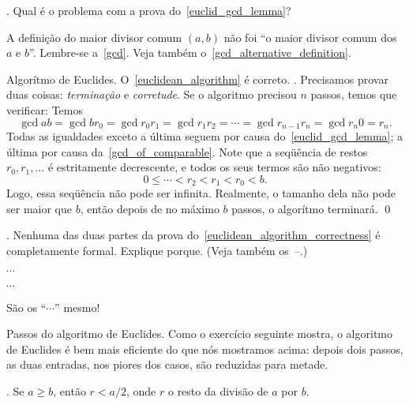 \exercise.
\label{what_is_the_problem_with_euclid_gcd_lemma}%
Qual é o problema com a prova do~\ref{euclid_gcd_lemma}?

\solution
A definição do maior divisor comum $(a,b)$ não foi
``o maior divisor comum dos $a$ e $b$''.
Lembre-se a~\ref{gcd}.
Veja também o~\ref{gcd_alternative_definition}.

\endexercise

\theorem Algorítmo de Euclides.
\label{euclidean_algorithm_correctness}%
O~\ref{euclidean_algorithm} é correto.
\proof.
Precisamos provar duas coisas: \emph{terminação\/}\/ e \emph{corretude}.
\endgraf
{}
Se o algoritmo precisou $n$ passos, temos que verificar:
Temos
$$
\gcd a b
= \gcd b {r_0}
= \gcd {r_0} {r_1}
= \gcd {r_1} {r_2}
= \dotsb
= \gcd {r_{n-1}} {r_n}
= \gcd {r_n} 0
= r_n.
$$
Todas as igualdades exceto a última seguem por causa do~\ref{euclid_gcd_lemma};
a última por causa da~\ref{gcd_of_comparable}.
\endgraf
{}
Note que a seqüência de restos $r_0, r_1, \ldots$ é estritamente
decrescente, e todos os seus termos são não negativos:
$$
0\leq \dotsb < r_2 < r_1 < r_0 < b.
$$
Logo, essa seqüência não pode ser infinita.
Realmente, o tamanho dela não pode ser maior que $b$,
então depois de no máximo $b$ passos, o algorítmo terminará.
\qed

\exercise.
\label{euclidean_algorithm_proof_why_informal}%
Nenhuma das duas partes da prova do~\ref{euclidean_algorithm_correctness}
é completamente formal.  Explique porque.
(Veja também os~--.)

\hint
${}\dotsb{}$

\hint
${}\dotsb{}$

\solution
São os ``${}\dotsb{}$'' mesmo!

\endexercise

\note Passos do algoritmo de Euclides.
Como o exercício seguinte mostra, o algoritmo de Euclides
é bem mais eficiente do que nós mostramos acima:
depois dois passos, as duas entradas, nos piores dos casos,
são reduzidas para metade.

\exercise.
\label{less_steps_in_euclid}%
Se $a \geq b$, então $r < a/2$, onde $r$ o resto da divisão de $a$ por $b$.

